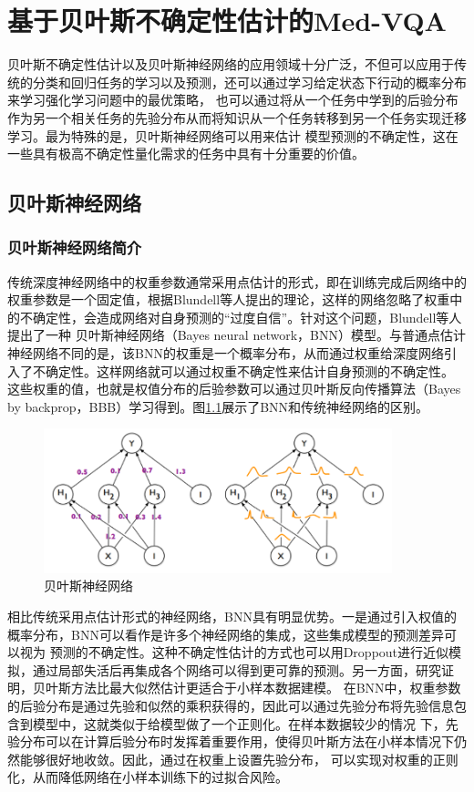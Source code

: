 \chapter{基于贝叶斯不确定性估计的Med-VQA}
贝叶斯不确定性估计以及贝叶斯神经网络的应用领域十分广泛，不但可以应用于传统的分类和回归任务的学习以及预测，还可以通过学习给定状态下行动的概率分布来学习强化学习问题中的最优策略，
也可以通过将从一个任务中学到的后验分布作为另一个相关任务的先验分布从而将知识从一个任务转移到另一个任务实现迁移学习。最为特殊的是，贝叶斯神经网络可以用来估计
模型预测的不确定性，这在一些具有极高不确定性量化需求的任务中具有十分重要的价值。
%
\section{贝叶斯神经网络}
\subsection{贝叶斯神经网络简介}
传统深度神经网络中的权重参数通常采用点估计的形式，即在训练完成后网络中的权重参数是一个固定值，根据Blundell等人\cite{blundell2015weight}提出的理论，这样的网络忽略了权重中的不确定性，会造成网络对自身预测的“过度自信”\cite{shridhar2019comprehensive}。针对这个问题，Blundell等人提出了一种
贝叶斯神经网络（Bayes neural network，BNN）模型。与普通点估计神经网络不同的是，该BNN的权重是一个概率分布，从而通过权重给深度网络引入了不确定性。这样网络就可以通过权重不确定性来估计自身预测的不确定性。
这些权重的值，也就是权值分布的后验参数可以通过贝叶斯反向传播算法（Bayes by backprop，BBB）学习得到。图\ref{BNN}展示了BNN和传统神经网络的区别。
\begin{figure}[htbp]
	\centering	
	\includegraphics[width=0.9\textwidth]{Fig/myfig/chapter4/BNN.png}  %
	\caption{\label{BNN}贝叶斯神经网络} 
\end{figure}

相比传统采用点估计形式的神经网络，BNN具有明显优势。一是通过引入权值的概率分布，BNN可以看作是许多个神经网络的集成，这些集成模型的预测差异可以视为
预测的不确定性。这种不确定性估计的方式也可以用Droppout进行近似模拟\cite{gal2016dropout}，通过局部失活后再集成各个网络可以得到更可靠的预测。另一方面，研究证明，贝叶斯方法比最大似然估计更适合于小样本数据建模\cite{mcneish2016using}。
在BNN中，权重参数的后验分布是通过先验和似然的乘积获得的，因此可以通过先验分布将先验信息包含到模型中，这就类似于给模型做了一个正则化。在样本数据较少的情况
下，先验分布可以在计算后验分布时发挥着重要作用，使得贝叶斯方法在小样本情况下仍然能够很好地收敛\cite{mcneish2016using}。因此，通过在权重上设置先验分布，
可以实现对权重的正则化，从而降低网络在小样本训练下的过拟合风险\cite{welling2011bayesian}。

